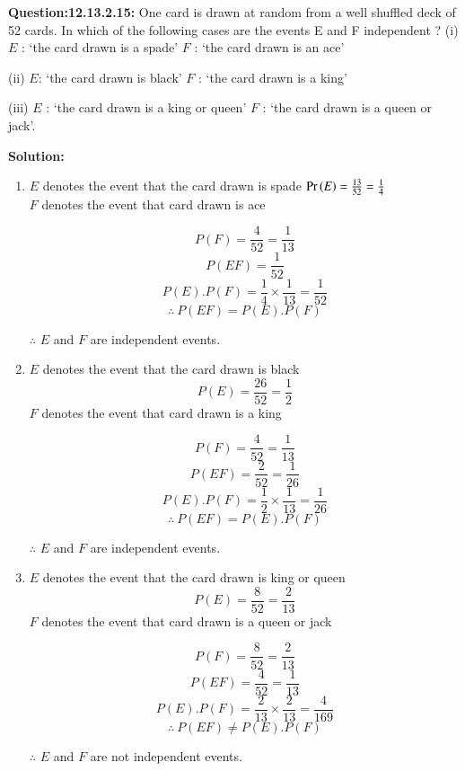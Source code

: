 \documentclass[12pt, journal]{IEEEtran}
\begin{document}
		\maketitle
		\textbf{Question:12.13.2.15:}
		One card is drawn at random from a well shuffled deck of 52 cards. In which of
		the following cases are the events E and F independent ?
			(i) $E$ : ‘the card drawn is a spade’
			$F$ : ‘the card drawn is an ace’
		
			(ii) $E$: ‘the card drawn is black’
			$F$ : ‘the card drawn is a king’
		
			(iii) $E$ : ‘the card drawn is a king or queen’
			$F$ : ‘the card drawn is a queen or jack’.
	
	\textbf{Solution:}

	\begin{enumerate}[label=(\roman*)]
		\item 
			$E$ denotes the event that the card drawn is spade 
				$\Pr\left(E\right) = \frac{13}{52} = \frac{1}{4}$ \\
			$F$ denotes the event that card drawn is ace 
			
			$$	P(F) = \frac{4}{52} = \frac{1}{13}$$
			$$	P(EF) = \frac{1}{52}$$
			$$	P(E).P(F) = \frac{1}{4} \times \frac{1}{13} = \frac{1}{52}$$
			$$	\therefore~P(EF) = P(E).P(F)$$
			
			$\therefore$  $E$ and $F$ are independent events. \\
		\item
			$E$ denotes the event that the card drawn is black 
				$$P(E) = \frac{26}{52} = \frac{1}{2}$$
			$F$ denotes the event that card drawn is a king 
			
			$$	P(F) = \frac{4}{52} = \frac{1}{13} $$
			$$	P(EF) = \frac{2}{52} = \frac{1}{26} $$
			$$	P(E).P(F) = \frac{1}{2} \times \frac{1}{13} = \frac{1}{26}$$
			$$	\therefore~P(EF) = P(E).P(F)$$
			
			$\therefore$  $E$ and $F$ are independent events. \\
		\item
			$E$ denotes the event that the card drawn is king or queen
				$$P(E) = \frac{8}{52} = \frac{2}{13}$$
			$F$ denotes the event that card drawn is a queen or jack 
			
			$$	P(F) = \frac{8}{52} = \frac{2}{13} $$
			$$	P(EF) = \frac{4}{52} = \frac{1}{13}$$
			$$	P(E).P(F) = \frac{2}{13} \times \frac{2}{13} = \frac{4}{169}$$
			$$	\therefore~P(EF) \neq P(E).P(F)$$
			
			$\therefore$  $E$ and $F$ are not independent events. \\
		
	\end{enumerate}
\end{document}
